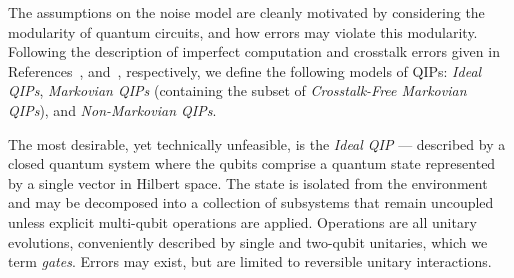 The assumptions on the noise model are cleanly motivated by considering the modularity of quantum circuits, and how errors may violate this modularity.
Following the description of imperfect computation and crosstalk errors given in References~\cite{hashim_practical_2025}, and~\cite{sarovar_detecting_2020}, respectively, we define the following models of QIPs: \emph{Ideal QIPs}, \emph{Markovian QIPs} (containing the subset of \emph{Crosstalk-Free Markovian QIPs}), and \emph{Non-Markovian QIPs}.

The most desirable, yet technically unfeasible, is the \emph{Ideal QIP} --- described by a closed quantum system where the qubits comprise a quantum state represented by a single vector in Hilbert space. The state is isolated from the environment and may be decomposed into a collection of subsystems that remain uncoupled unless explicit multi-qubit operations are applied. Operations are all unitary evolutions, conveniently described by single and two-qubit unitaries, which we term \emph{gates}. Errors may exist, but are limited to reversible unitary interactions.\

